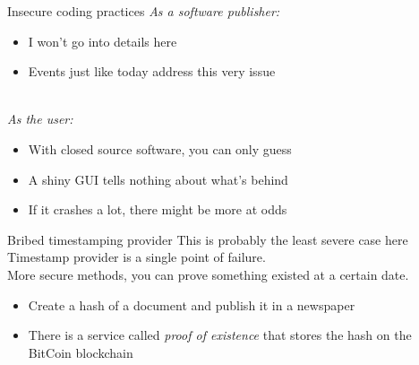 \documentclass[11pt]{beamer}
\begin{document}
\begin{frame}{Insecure coding practices}
\emph{As a software publisher:}
\begin{itemize}
\item I won't go into details here
\item Events just like today address this very issue
\end{itemize}
\\[0.2cm]
\pause
\emph{As the user:}
\begin{itemize}
\item With closed source software, you can only guess
\item A shiny GUI tells nothing about what's behind
\item If it crashes a lot, there might be more at odds
\end{itemize}
\end{frame}

\begin{frame}{Bribed timestamping provider}
This is probably the least severe case here
\\[0.2cm]
Timestamp provider is a single point of failure.
\\[0.2cm]
More secure methods, you can prove something existed at a certain date.
\\[0.2cm]
\pause
\begin{itemize}
\item Create a hash of a document and publish it in a newspaper
\pause
\item There is a service called \emph{proof of existence} that stores the hash on the BitCoin blockchain
\end{itemize}
\end{frame}
\end{document}
